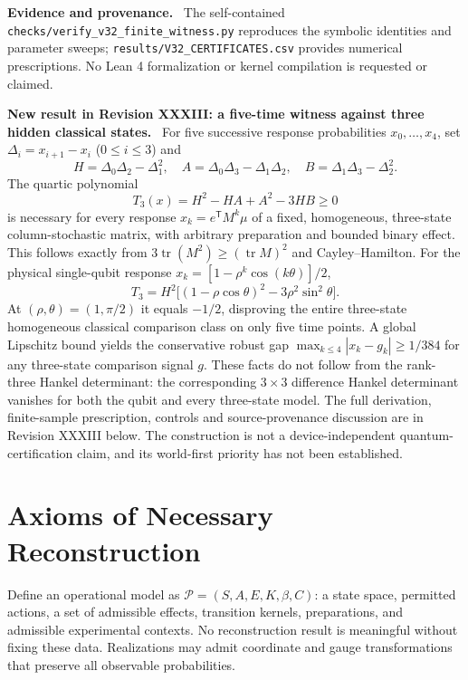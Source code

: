 \documentclass[11pt,a4paper,oneside]{book}
\newcommand{\note}[1]{\par\medskip\noindent\textbf{#1}\ }
\begin{document}
\note{Evidence and provenance.} The self-contained \texttt{checks/verify\_v32\_finite\_witness.py} reproduces the symbolic identities and parameter sweeps; \texttt{results/V32\_CERTIFICATES.csv} provides numerical prescriptions. No Lean 4 formalization or kernel compilation is requested or claimed.
\note{New result in Revision XXXIII: a five-time witness against three hidden classical states.} For five successive response probabilities $x_0,\ldots,x_4$, set $\Delta_i=x_{i+1}-x_i$ ($0\le i\le3$) and
\[H=\Delta_0\Delta_2-\Delta_1^2,\quad A=\Delta_0\Delta_3-\Delta_1\Delta_2,\quad B=\Delta_1\Delta_3-\Delta_2^2.\]
The quartic polynomial
\begin{equation}T_3(x)=H^2-HA+A^2-3HB\ge0\tag{21}\end{equation}
is necessary for every response $x_k=e^{\mathsf T}M^k\mu$ of a fixed, homogeneous, three-state column-stochastic matrix, with arbitrary preparation and bounded binary effect. This follows exactly from $3\operatorname{tr}(M^2)\ge(\operatorname{tr}M)^2$ and Cayley--Hamilton. For the physical single-qubit response $x_k=[1-\rho^k\cos(k\theta)]/2$,
\[T_3=H^2\bigl[(1-\rho\cos\theta)^2-3\rho^2\sin^2\theta\bigr].\]
At $(\rho,\theta)=(1,\pi/2)$ it equals $-1/2$, disproving the entire three-state homogeneous classical comparison class on only five time points. A global Lipschitz bound yields the conservative robust gap $\max_{k\le4}|x_k-g_k|\ge1/384$ for any three-state comparison signal $g$. These facts do not follow from the rank-three Hankel determinant: the corresponding $3\times3$ difference Hankel determinant vanishes for both the qubit and every three-state model. The full derivation, finite-sample prescription, controls and source-provenance discussion are in Revision XXXIII below. The construction is not a device-independent quantum-certification claim, and its world-first priority has not been established.
\setcounter{equation}{21}


\chapter{Axioms of Necessary Reconstruction}
Define an operational model as $\mathcal P=(S,A,E,K,\beta,C)$: a state space, permitted actions, a set of admissible effects, transition kernels, preparations, and admissible experimental contexts. No reconstruction result is meaningful without fixing these data. Realizations may admit coordinate and gauge transformations that preserve all observable probabilities.
\end{document}
